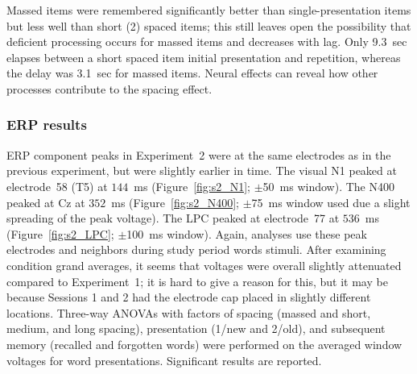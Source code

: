Massed items were remembered significantly better than single-presentation items but less well than short (2) spaced items; this still leaves open the possibility that deficient processing occurs for massed items and decreases with lag.  Only 9.3~sec elapses between a short spaced item initial presentation and repetition, whereas the delay was 3.1~sec for massed items.  Neural effects can reveal how other processes contribute to the spacing effect.

\subsubsection{ERP results}

ERP component peaks in Experiment~2 were at the same electrodes as in the previous experiment, but were slightly earlier in time.
The visual N1 peaked at electrode~58 (T5) at $144$~ms (Figure~\ref{fig:s2_N1}; $\pm$50~ms window).  The N400 peaked at Cz at $352$~ms (Figure~\ref{fig:s2_N400}; $\pm$75~ms window used due a slight spreading of the peak voltage).  The LPC peaked at electrode~77 at $536$~ms (Figure~\ref{fig:s2_LPC}; $\pm$100~ms window).  Again, analyses use these peak electrodes and neighbors during study period words stimuli.  After examining condition grand averages, it seems that voltages were overall slightly attenuated compared to Experiment~1; it is hard to give a reason for this, but it may be because Sessions 1 and 2 had the electrode cap placed in slightly different locations.
Three-way ANOVAs with factors of spacing (massed and short, medium, and long spacing), presentation (1/new and 2/old), and subsequent memory (recalled and forgotten words) were performed on the averaged window voltages for word presentations.  Significant results are reported.


